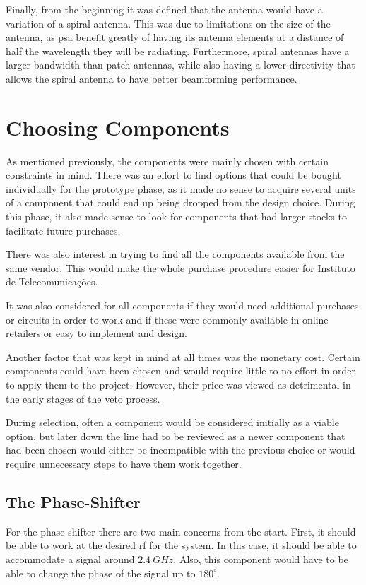 \par Finally, from the beginning it was defined that the antenna would have a variation of a spiral antenna. This was due to limitations on the size of the antenna, as \ac{psa} benefit greatly of having its antenna elements at a distance of half the wavelength they will be radiating. Furthermore, spiral antennas have a larger bandwidth than patch antennas, while also having a lower directivity that allows the spiral antenna to have better beamforming performance.

\section{Choosing Components}
\par As mentioned previously, the components were mainly chosen with certain constraints in mind. There was an effort to find options that could be bought individually for the prototype phase, as it made no sense to acquire several units of a component that could end up being dropped from the design choice. During this phase, it also made sense to look for components that had larger stocks to facilitate future purchases.

\par There was also interest in trying to find all the components available from the same vendor. This would make the whole purchase procedure easier for Instituto de Telecomunicações.

\par It was also considered for all components if they would need additional purchases or circuits in order to work and if these were commonly available in online retailers or easy to implement and design.

\par Another factor that was kept in mind at all times was the monetary cost. Certain components could have been chosen and would require little to no effort in order to apply them to the project. However, their price was viewed as detrimental in the early stages of the veto process.

\par During selection, often a component would be considered initially as a viable option, but later down the line had to be reviewed as a newer component that had been chosen would either be incompatible with the previous choice or would require unnecessary steps to have them work together.

\subsection{The Phase-Shifter}
\par For the phase-shifter there are two main concerns from the start. First, it should be able to work at the desired \ac{rf} for the system. In this case, it should be able to accommodate a signal around $2.4\:\si{GHz}$. Also, this component would have to be able to change the phase of the signal up to $180^{\circ}$. 

